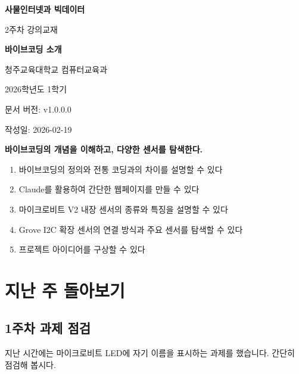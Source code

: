 \documentclass[11pt, a4paper]{article}
\begin{document}
\begin{titlepage}
\centering
\vspace*{3cm}
{\Huge\bfseries\color{mainblue} 사물인터넷과 빅데이터\par}
\vspace{0.5cm}
{\LARGE 2주차 강의교재\par}
\vspace{1.5cm}
{\Huge\bfseries 바이브코딩 소개\par}
\vspace{2cm}
{\large 청주교육대학교 컴퓨터교육과\par}
\vspace{0.3cm}
{\large 2026학년도 1학기\par}
\vspace{3cm}
{\normalsize 문서 버전: v1.0.0.0\par}
{\normalsize 작성일: 2026-02-19\par}
\end{titlepage}

\tableofcontents
\newpage

\begin{corebox}[학습 목표]
\textbf{바이브코딩의 개념을 이해하고, 다양한 센서를 탐색한다.}
\begin{enumerate}[leftmargin=1.5em]
\item 바이브코딩의 정의와 전통 코딩과의 차이를 설명할 수 있다
\item Claude를 활용하여 간단한 웹페이지를 만들 수 있다
\item 마이크로비트 V2 내장 센서의 종류와 특징을 설명할 수 있다
\item Grove I2C 확장 센서의 연결 방식과 주요 센서를 탐색할 수 있다
\item 프로젝트 아이디어를 구상할 수 있다
\end{enumerate}
\end{corebox}

\section{지난 주 돌아보기}

\subsection{1주차 과제 점검}

지난 시간에는 마이크로비트 LED에 자기 이름을 표시하는 과제를 했습니다. 간단히 점검해 봅시다.
\end{document}
